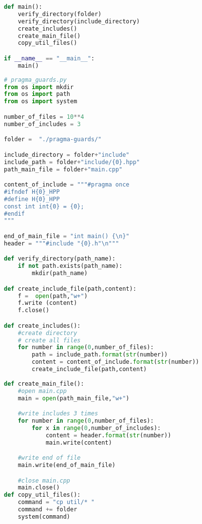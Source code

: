 \begin{apendicesenv}
\begin{lstlisting}[language=Python, caption={
Script Guardas de Inclusão Interna primeiro que \textit{Pragma Once}},
                   label=script_guards_pragma_include]
def main():
    verify_directory(folder)
    verify_directory(include_directory)
    create_includes()
    create_main_file()
    copy_util_files()

if __name__ == "__main__":
    main()
\end{lstlisting}

\begin{lstlisting}[language=Python, caption={
    Script \textit{Pragma Once} primeiro que Guardas de Inclusão Interna},label=script_pragma_guards_include]
# pragma_guards.py
from os import mkdir
from os import path
from os import system

number_of_files = 10**4
number_of_includes = 3

folder =  "./pragma-guards/"

include_directory = folder+"include"
include_path = folder+"include/{0}.hpp"
path_main_file = folder+"main.cpp"

content_of_include = """#pragma once
#ifndef H{0}_HPP
#define H{0}_HPP
const int int{0} = {0};
#endif
"""

end_of_main_file = "int main() {\n}"
header = """#include "{0}.h"\n"""

def verify_directory(path_name):
    if not path.exists(path_name):
        mkdir(path_name)

def create_include_file(path,content):
    f =  open(path,"w+")
    f.write (content)
    f.close()

def create_includes():
    #create directory
    # create all files
    for number in range(0,number_of_files):
        path = include_path.format(str(number))
        content = content_of_include.format(str(number))
        create_include_file(path,content)
    
def create_main_file():
    #open main.cpp
    main = open(path_main_file,"w+")

    #write includes 3 times
    for number in range(0,number_of_files):
        for x in range(0,number_of_includes):
            content = header.format(str(number))
            main.write(content)

    #write end of file
    main.write(end_of_main_file)

    #close main.cpp
    main.close()
def copy_util_files():                                                           
    command = "cp util/* "                                                       
    command += folder                                                            
    system(command)                                                              


\end{lstlisting}
\end{apendicesenv}
